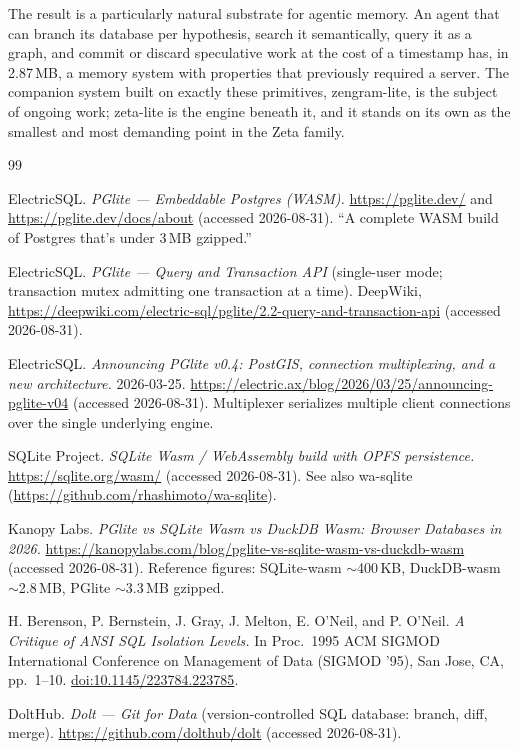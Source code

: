\documentclass[11pt]{article}
\newcommand{\doi}[1]{\href{https://doi.org/#1}{doi:#1}}
\begin{document}
The result is a particularly natural substrate for agentic memory. An agent that can
branch its database per hypothesis, search it semantically, query it as a graph, and
commit or discard speculative work at the cost of a timestamp has, in 2.87\,MB, a
memory system with properties that previously required a server. The companion system
built on exactly these primitives, zengram-lite, is the subject of ongoing work;
zeta-lite is the engine beneath it, and it stands on its own as the smallest and most
demanding point in the Zeta family.

\begin{thebibliography}{99}
\small

 ElectricSQL. \emph{PGlite --- Embeddable Postgres (WASM).}
\url{https://pglite.dev/} and \url{https://pglite.dev/docs/about} (accessed
2026-08-31). ``A complete WASM build of Postgres that's under 3\,MB gzipped.''

 ElectricSQL. \emph{PGlite --- Query and Transaction API}
(single-user mode; transaction mutex admitting one transaction at a time). DeepWiki,
\url{https://deepwiki.com/electric-sql/pglite/2.2-query-and-transaction-api}
(accessed 2026-08-31).

 ElectricSQL. \emph{Announcing PGlite v0.4: PostGIS, connection
multiplexing, and a new architecture.} 2026-03-25.
\url{https://electric.ax/blog/2026/03/25/announcing-pglite-v04} (accessed
2026-08-31). Multiplexer serializes multiple client connections over the single
underlying engine.

 SQLite Project. \emph{SQLite Wasm / WebAssembly build with OPFS
persistence.} \url{https://sqlite.org/wasm/} (accessed 2026-08-31). See also
wa-sqlite (\url{https://github.com/rhashimoto/wa-sqlite}).

 Kanopy Labs. \emph{PGlite vs SQLite Wasm vs DuckDB Wasm: Browser
Databases in 2026.}
\url{https://kanopylabs.com/blog/pglite-vs-sqlite-wasm-vs-duckdb-wasm} (accessed
2026-08-31). Reference figures: SQLite-wasm $\sim$400\,KB, DuckDB-wasm $\sim$2.8\,MB,
PGlite $\sim$3.3\,MB gzipped.

 H. Berenson, P. Bernstein, J. Gray, J. Melton, E. O'Neil, and P.
O'Neil. \emph{A Critique of ANSI SQL Isolation Levels.} In Proc.\ 1995 ACM SIGMOD
International Conference on Management of Data (SIGMOD '95), San Jose, CA, pp.\
1--10. \doi{10.1145/223784.223785}.

 DoltHub. \emph{Dolt --- Git for Data} (version-controlled SQL
database: branch, diff, merge). \url{https://github.com/dolthub/dolt} (accessed
2026-08-31).


\end{thebibliography}
\end{document}
